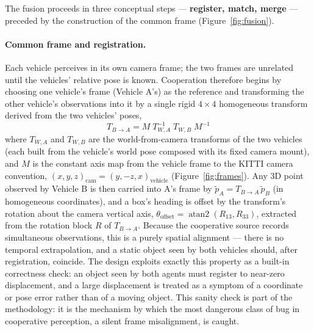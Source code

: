 The fusion proceeds in three conceptual steps --- \textbf{register, match, merge}
--- preceded by the construction of the common frame (Figure~\ref{fig:fusion}).

\paragraph{Common frame and registration.} Each vehicle perceives in its own camera
frame; the two frames are unrelated until the vehicles' relative pose is known.
Cooperation therefore begins by choosing one vehicle's frame (Vehicle A's) as the
reference and transforming the other vehicle's observations into it by a single
rigid $4\times4$ homogeneous transform derived from the two vehicles' poses,
\begin{equation}
T_{B \rightarrow A} = M \; T_{W,A}^{-1} \; T_{W,B} \; M^{-1}
\label{eq:registration}
\end{equation}
where $T_{W,A}$ and $T_{W,B}$ are the world-from-camera transforms of the two
vehicles (each built from the vehicle's world pose composed with its fixed camera
mount), and $M$ is the constant axis map from the vehicle frame to the KITTI camera
convention, $(x, y, z)_{\text{cam}} = (y, -z, x)_{\text{vehicle}}$
(Figure~\ref{fig:frames}). Any 3D point observed by Vehicle B is then carried into
A's frame by $\tilde{p}_A = T_{B \rightarrow A}\, \tilde{p}_B$ (in homogeneous
coordinates), and a box's heading is offset by the transform's rotation about the
camera vertical axis, $\theta_{\text{offset}} = \operatorname{atan2}(R_{13}, R_{33})$,
extracted from the rotation block $R$ of $T_{B \rightarrow A}$. Because the
cooperative source records simultaneous observations, this is a purely spatial
alignment --- there is no temporal extrapolation, and a static object seen by both
vehicles should, after registration, coincide. The design exploits exactly this
property as a built-in correctness check: an object seen by both agents must
register to near-zero displacement, and a large displacement is treated as a symptom
of a coordinate or pose error rather than of a moving object. This sanity check is
part of the methodology: it is the mechanism by which the
most dangerous class of bug in cooperative perception, a silent frame misalignment,
is caught.

